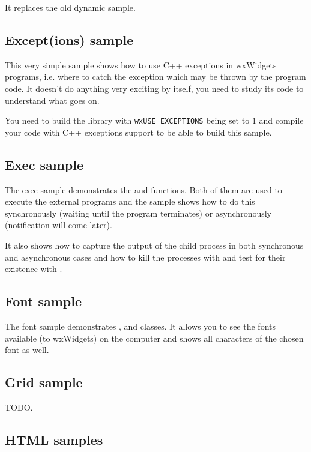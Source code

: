 It replaces the old dynamic sample.


\subsection{Except(ions) sample}\label{sampleexcept}

This very simple sample shows how to use C++ exceptions in wxWidgets programs,
i.e. where to catch the exception which may be thrown by the program code. It
doesn't do anything very exciting by itself, you need to study its code to
understand what goes on.

You need to build the library with \texttt{wxUSE\_EXCEPTIONS} being set to $1$
and compile your code with C++ exceptions support to be able to build this
sample.


\subsection{Exec sample}\label{sampleexec}

The exec sample demonstrates the  and
 functions. Both of them are used to execute the
external programs and the sample shows how to do this synchronously (waiting
until the program terminates) or asynchronously (notification will come later).

It also shows how to capture the output of the child process in both
synchronous and asynchronous cases and how to kill the processes with
 and test for their existence with
.


\subsection{Font sample}\label{samplefont}

The font sample demonstrates ,
 and
 classes. It allows you to see the fonts
available (to wxWidgets) on the computer and shows all characters of the
chosen font as well.


\subsection{Grid sample}\label{samplegrid}

TODO.


\subsection{HTML samples}\label{samplehtml}

